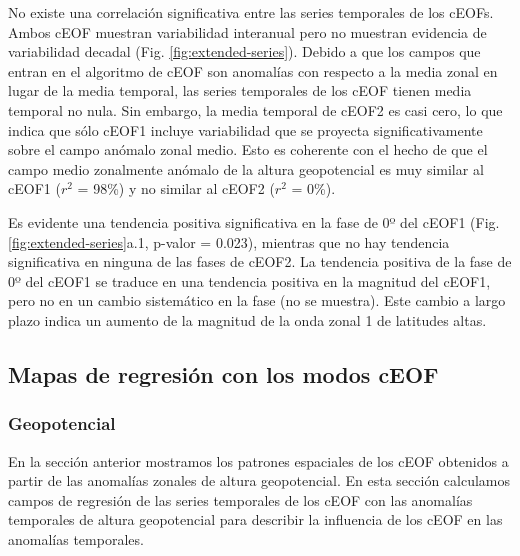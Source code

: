 \documentclass[12pt,oneside]{reedthesis}
\begin{document}
No existe una correlación significativa entre las series temporales de los cEOFs.
Ambos cEOF muestran variabilidad interanual pero no muestran evidencia de variabilidad decadal (Fig. \ref{fig:extended-series}).
Debido a que los campos que entran en el algoritmo de cEOF son anomalías con respecto a la media zonal en lugar de la media temporal, las series temporales de los cEOF tienen media temporal no nula.
Sin embargo, la media temporal de cEOF2 es casi cero, lo que indica que sólo cEOF1 incluye variabilidad que se proyecta significativamente sobre el campo anómalo zonal medio.
Esto es coherente con el hecho de que el campo medio zonalmente anómalo de la altura geopotencial es muy similar al cEOF1 (\(r^2\) = 98\%) y no similar al cEOF2 (\(r^2\) = 0\%).

Es evidente una tendencia positiva significativa en la fase de 0º del cEOF1 (Fig. \ref{fig:extended-series}a.1, p-valor = 0.023), mientras que no hay tendencia significativa en ninguna de las fases de cEOF2.
La tendencia positiva de la fase de 0º del cEOF1 se traduce en una tendencia positiva en la magnitud del cEOF1, pero no en un cambio sistemático en la fase (no se muestra).
Este cambio a largo plazo indica un aumento de la magnitud de la onda zonal 1 de latitudes altas.

\hypertarget{mapas-de-regresiuxf3n-con-los-modos-ceof}{%
\subsection{Mapas de regresión con los modos cEOF}\label{mapas-de-regresiuxf3n-con-los-modos-ceof}}

\hypertarget{geopotencial}{%
\subsubsection{Geopotencial}\label{geopotencial}}

En la sección anterior mostramos los patrones espaciales de los cEOF obtenidos a partir de las anomalías zonales de altura geopotencial.
En esta sección calculamos campos de regresión de las series temporales de los cEOF con las anomalías temporales de altura geopotencial para describir la influencia de los cEOF en las anomalías temporales.
\end{document}
